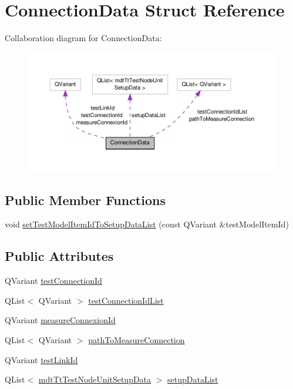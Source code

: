 \hypertarget{struct_connection_data}{\section{Connection\-Data Struct Reference}
\label{struct_connection_data}
}


Collaboration diagram for Connection\-Data\-:
\nopagebreak
\begin{figure}[H]
\begin{center}
\leavevmode
\includegraphics[width=350pt]{struct_connection_data__coll__graph}
\end{center}
\end{figure}
\subsection*{Public Member Functions}
\begin{DoxyCompactItemize}
\item 
void \hyperlink{struct_connection_data_ac790aedc0f9ce7fb066e397e172041a5}{set\-Test\-Model\-Item\-Id\-To\-Setup\-Data\-List} (const Q\-Variant \&test\-Model\-Item\-Id)
\end{DoxyCompactItemize}
\subsection*{Public Attributes}
\begin{DoxyCompactItemize}
\item 
Q\-Variant \hyperlink{struct_connection_data_a3da4cbc16a1095b7585cb39025ab435d}{test\-Connection\-Id}
\item 
Q\-List$<$ Q\-Variant $>$ \hyperlink{struct_connection_data_ad05beaa38c489196bb56c4ca45091679}{test\-Connection\-Id\-List}
\item 
Q\-Variant \hyperlink{struct_connection_data_a548886cbcb952e74cf54a08f92a8641d}{measure\-Connexion\-Id}
\item 
Q\-List$<$ Q\-Variant $>$ \hyperlink{struct_connection_data_ab0f00378b10ebf0ca919884a68144097}{path\-To\-Measure\-Connection}
\item 
Q\-Variant \hyperlink{struct_connection_data_a96c433ac0d7ac7d57e73d7edb37e5d32}{test\-Link\-Id}
\item 
Q\-List$<$ \hyperlink{classmdt_tt_test_node_unit_setup_data}{mdt\-Tt\-Test\-Node\-Unit\-Setup\-Data} $>$ \hyperlink{struct_connection_data_a6aef86fe5e939ef8cdc4a159964b3d5e}{setup\-Data\-List}
\end{DoxyCompactItemize}


